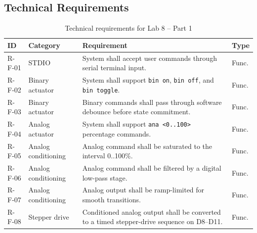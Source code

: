 \documentclass[12pt]{article}
\begin{document}
\subsection{Technical Requirements}
\begin{table}[H]
\centering
\small
\begin{tabular}{p{1.5cm} p{2.6cm} p{7.1cm} p{1.3cm}}
\toprule
\textbf{ID} & \textbf{Category} & \textbf{Requirement} & \textbf{Type} \\
\midrule
R-F-01 & STDIO & System shall accept user commands through serial terminal input. & Func. \\
R-F-02 & Binary actuator & System shall support \texttt{bin on}, \texttt{bin off}, and \texttt{bin toggle}. & Func. \\
R-F-03 & Binary actuator & Binary commands shall pass through software debounce before state commitment. & Func. \\
R-F-04 & Analog actuator & System shall support \texttt{ana <0..100>} percentage commands. & Func. \\
R-F-05 & Analog conditioning & Analog command shall be saturated to the interval 0..100\%. & Func. \\
R-F-06 & Analog conditioning & Analog command shall be filtered by a digital low-pass stage. & Func. \\
R-F-07 & Analog conditioning & Analog output shall be ramp-limited for smooth transitions. & Func. \\
R-F-08 & Stepper drive & Conditioned analog output shall be converted to a timed stepper-drive sequence on D8--D11. & Func. \\
\bottomrule
\end{tabular}
\caption{Technical requirements for Lab 8 -- Part 1}
\label{tab:requirements1}
\end{table}
\end{document}
